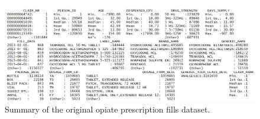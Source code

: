 \documentclass[twoside,10.5pt]{article}
\begin{document}
\begin{figure}[h!]
\begin{center}
\includegraphics[width=6in]{images/original_presc_summary.JPG}
\end{center}
\caption{Summary of the original opiate prescription fills dataset.}
\label{fig:orig_presc}
\end{figure}

\newpage
\theendnotes


\end{document}
